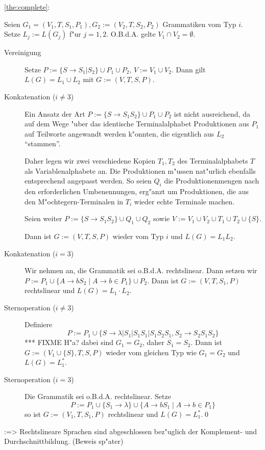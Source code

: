 \proof \ref{the:complete}:{
  Seien $G_1=(V_1,T,S_1,P_1),G_2:=(V_2,T,S_2,P_2)$ Grammatiken
  vom Typ $i$. Setze $L_j:=L(G_j)$ f"ur $j=1,2$. O.B.d.A. gelte
  $V_1\cap V_2=\emptyset$.
  \begin{description}
    \item[Vereinigung] Setze $P:=\{S\to S_1|S_2\}\cup P_1\cup P_2$,
      $V:=V_1\cup V_2$. Dann gilt $L(G)=L_1\cup L_2$ mit $G:=(V,T,S,P)$.
    \item[Konkatenation ($i\ne 3$)] Ein Ansatz 
      der Art $P:=\{S \to S_1S_2\}\cup P_1\cup P_2$ 
      ist nicht ausreichend, da auf dem Wege "uber das identische 
      Terminalalphabet Produktionen aus $P_1$ auf Teilworte angewandt werden 
      k"onnten, die eigentlich aus $L_2$ ``stammen''.
    
      Daher legen wir zwei verschiedene Kopien $T_1, T_2$ des
      Terminalalphabets $T$ als Variablenalphabete an. Die
      Produktionen m"ussen nat"urlich ebenfalls entsprechend angepasst
      werden. So seien $Q_i$ die Produktionenmengen nach den erforderlichen
      Umbenennungen, erg"anzt um Produktionen, die aus den 
      M"ochtegern-Terminalen in $T_i$ wieder echte Terminale machen.
    
      Seien weiter $P:=\{S\to S_1S_2\}\cup Q_1\cup Q_2$ sowie 
      $V:=V_1\cup V_2\cup T_1\cup T_2\cup\{S\}$.
    
      Dann ist $G:=(V,T,S,P)$ wieder vom Typ $i$ und $L(G) = L_1L_2$.
    \item[Konkatenation ($i=3$)] Wir nehmen an, die Grammatik sei
      o.B.d.A. rechtslinear. Dann setzen wir
      $P:=P_1\cup\{A\to bS_2\mid A\to b\in P_1\}\cup P_2$.
      Dann ist $G:=(V,T,S_1,P)$ rechtslinear und $L(G)=L_1\cdot L_2$.
    \item[Sternoperation ($i\ne 3$)] Definiere 
      \[P:=P_1\cup\{S\to\lambda|S_1|S_1S_1|S_1S_2S_1,S_2\to S_2S_1S_2\}
        \]
      *** FIXME H"a?
      dabei sind $G_1=G_2$, daher $S_1=S_2$. Dann ist 
      $G:=(V_1\cup\{S\},T,S,P)$ wieder vom gleichen Typ wie $G_1=G_2$ und
      $L(G)=L_1^*$.
    \item[Sternoperation ($i = 3$)] Die Grammatik sei o.B.d.A. 
      rechtslinear. Setze
      \[P:=P_1\cup\{S_1\to\lambda\}\cup\{A\to bS_1\mid A\to b \in P_1\}
        \]
      so ist $G:=(V_1,T,S_1,P)$ rechtslinear und $L(G)=L_1^*$.\qed
    \end{description}
  }
\theorem:=>{
  Rechtslineare Sprachen sind abgeschlossen bez"uglich der Komplement-
  und Durchschnittbildung. (Beweis sp"ater)
  }
